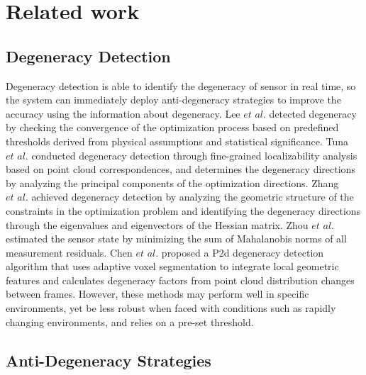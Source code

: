 \section{Related work}
\subsection{Degeneracy Detection}


Degeneracy detection is able to identify the degeneracy of sensor in real time, so the system can immediately deploy anti-degeneracy strategies to improve the accuracy using the information about degeneracy.
Lee $\textit{et al.}$ \cite{lee2024switch} detected degeneracy by checking the convergence of the optimization process based on predefined thresholds derived from physical assumptions and statistical significance. Tuna $\textit{et al.}$ \cite{tuna2023x} conducted degeneracy detection through fine-grained localizability analysis based on point cloud correspondences, and determines the degeneracy directions by analyzing the principal components of the optimization directions. Zhang $\textit{et al.}$ \cite{zhang2016degeneracy} achieved degeneracy detection by analyzing the geometric structure of the constraints in the optimization problem and identifying the degeneracy directions through the eigenvalues and eigenvectors of the Hessian matrix. Zhou $\textit{et al.}$ \cite{zhou2020lidar}  estimated the sensor state by minimizing the sum of Mahalanobis norms of all measurement residuals. Chen $\textit{et al.}$ \cite{10816047} proposed a P2d degeneracy detection algorithm that uses adaptive voxel segmentation to integrate local geometric features and calculates degeneracy factors from point cloud distribution changes between frames. However, these methods may perform well in specific environments, yet be less robust when faced with conditions such as rapidly changing environments, and relies on a pre-set threshold.

\subsection{Anti-Degeneracy Strategies}


